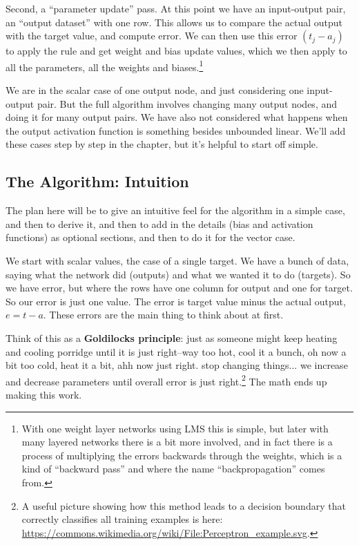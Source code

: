 Second, a ``parameter update'' pass. At this point we have an  input-output pair, an ``output dataset'' with one row.  This allows us to compare the actual output with the target value, and compute error. We can then use this error $ (t_j - a_j)$ to apply the rule and get weight and bias update values, which we then apply to all the parameters, all the weights and biases.\footnote{With one weight layer networks using LMS this is simple, but later with many layered networks there is a bit more involved, and in fact there is a process of multiplying the errors backwards through the weights, which is a kind of ``backward pass'' and where the name ``backpropagation'' comes from.}

We are in the scalar case of one output node, and just considering one input-output pair. But the full algorithm involves changing many output nodes, and doing it for many output pairs.  We have also not considered what happens when the output activation function is something besides unbounded linear. We'll add these cases step by step in the chapter, but it's helpful to start off simple.


\subsection{The Algorithm: Intuition}

The plan here will be to give an intuitive feel for the algorithm in a simple case, and then to derive it, and then to add in the details (bias and activation functions) as optional sections, and then to do it for the vector case.

We start with scalar values, the case of a single target. We have a bunch of data, saying what the network did (outputs) and what we wanted it to do (targets). So we have error, but where the rows have one column for output and one for target. So our error is just one value. The error is target value minus the actual output, $e = t-a$. These errors are the main thing to think about at first. 

Think of this as a  {\bf Goldilocks principle}: just as someone might keep heating and cooling porridge until it is just right--way too hot, cool it a bunch, oh now a bit too cold, heat it a bit, ahh now just right. stop changing things... we increase and decrease parameters until overall error is just right.\footnote{A useful picture showing how this method leads to a decision boundary that correctly classifies all training examples is here: \url{https://commons.wikimedia.org/wiki/File:Perceptron_example.svg}.} The math ends up making this work.

